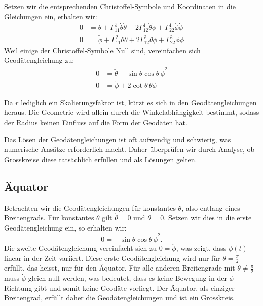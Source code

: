 Setzen wir die entsprechenden Christoffel-Symbole und Koordinaten in die Gleichungen ein, erhalten wir:
\begin{equation}
	\begin{aligned} 
		0 &= \ddot{\theta} + \Gamma^1_{11} \dot{\theta} \dot{\theta} + 2\Gamma^1_{12} \dot{\theta}\dot{\phi} + \Gamma^1_{22} \dot{\phi} \dot{\phi} \\
		0 &= \ddot{\phi} + \Gamma^2_{11} \dot{\theta} \dot{\theta} + 2\Gamma^2_{12} \dot{\theta}\dot{\phi} + \Gamma^2_{22} \dot{\phi} \dot{\phi}
	\end{aligned}
\end{equation}
Weil einige der Christoffel-Symbole Null sind, vereinfachen sich Geodätengleichung zu:
\begin{align}
	0 &= \ddot{\theta} - \sin\theta \cos\theta \, \dot{\phi}^2 \\
	0 &= \ddot{\phi} + 2 \cot\theta \, \dot{\theta} \dot{\phi}
\end{align}

Da $r$ lediglich ein Skalierungsfaktor ist, kürzt es sich in den Geodätengleichungen heraus. 
Die Geometrie wird allein durch die Winkelabhängigkeit bestimmt, sodass der Radius keinen Einfluss auf die Form der Geodäten hat.

Das Lösen der Geodätengleichungen ist oft aufwendig und schwierig, was numerische Ansätze erforderlich macht. 
Daher überprüfen wir durch Analyse, ob Grosskreise diese tatsächlich erfüllen und als Lösungen gelten.

\subsection{Äquator}
Betrachten wir die Geodätengleichungen für konstantes $\theta$, also entlang eines Breitengrads.
Für konstantes $\theta$ gilt $\dot{\theta} = 0$ und $\ddot{\theta} = 0$.
Setzen wir dies in die erste Geodätengleichung ein, so erhalten wir:
\begin{equation}
	0 = -\sin\theta \cos\theta \, \dot{\phi}^2.
\end{equation}
Die zweite Geodätengleichung vereinfacht sich zu $0 = \ddot{\phi}$, was zeigt, dass $\phi(t)$ linear in der Zeit variiert.
Diese erste Geodätengleichung wird nur für $\theta = \frac{\pi}{2}$ erfüllt, das heisst, nur für den Äquator.
Für alle anderen Breitengrade mit $\theta \neq \frac{\pi}{2}$ muss $\dot{\phi}$ gleich null werden, was bedeutet, dass es keine Bewegung in der $\phi$-Richtung gibt und somit keine Geodäte vorliegt.
Der Äquator, als einziger Breitengrad, erfüllt daher die Geodätengleichungen und ist ein Grosskreis.

